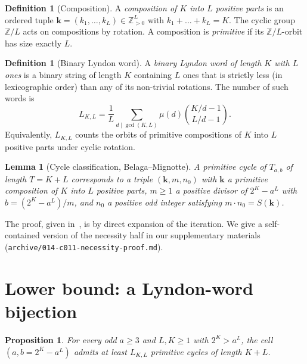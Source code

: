 \documentclass[11pt]{amsart}
\theoremstyle{plain}
\newtheorem{lemma}[theorem]{Lemma}
\newtheorem{proposition}[theorem]{Proposition}
\theoremstyle{definition}
\newtheorem{definition}[theorem]{Definition}
\begin{document}
\begin{definition}[Composition]
A \emph{composition of $K$ into $L$ positive parts} is an ordered
tuple $\mathbf{k} = (k_1, \dots, k_L) \in \mathbb{Z}_{>0}^L$ with
$k_1 + \dots + k_L = K$. The cyclic group $\mathbb{Z}/L$ acts on
compositions by rotation. A composition is \emph{primitive} if its
$\mathbb{Z}/L$-orbit has size exactly $L$.
\end{definition}

\begin{definition}[Binary Lyndon word]
A \emph{binary Lyndon word of length $K$ with $L$ ones} is a binary
string of length $K$ containing $L$ ones that is strictly less (in
lexicographic order) than any of its non-trivial rotations. The number
of such words is
\[
L_{K,L} = \frac{1}{L}\sum_{d \mid \gcd(K,L)} \mu(d)\binom{K/d-1}{L/d-1}.
\]
Equivalently, $L_{K,L}$ counts the orbits of primitive compositions
of $K$ into $L$ positive parts under cyclic rotation.
\end{definition}

\begin{lemma}[Cycle classification, Belaga--Mignotte] \label{lem:bm}
A primitive cycle of $T_{a,b}$ of length $T = K + L$ corresponds to
a triple $(\mathbf{k}, m, n_0)$ with $\mathbf{k}$ a primitive
composition of $K$ into $L$ positive parts, $m \geq 1$ a positive
divisor of $2^K - a^L$ with $b = (2^K - a^L)/m$, and $n_0$ a positive
odd integer satisfying $m \cdot n_0 = S(\mathbf{k})$.
\end{lemma}

The proof, given in~\cite{belaga-mignotte}, is by direct expansion of
the iteration. We give a self-contained version of the necessity half
in our supplementary materials (\texttt{archive/014-c011-necessity-proof.md}).

\section{Lower bound: a Lyndon-word bijection} \label{sec:lower}

\begin{proposition} \label{prop:lower}
For every odd $a \geq 3$ and $L, K \geq 1$ with $2^K > a^L$, the cell
$(a, b = 2^K - a^L)$ admits at least $L_{K,L}$ primitive cycles of
length $K + L$.
\end{proposition}
\end{document}
